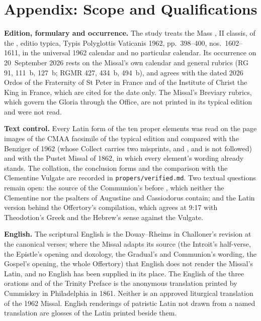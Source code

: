 \section{Appendix: Scope and Qualifications}
\label{sec:scope}

{\small
\textbf{Edition, formulary and occurrence.} The study treats the Mass
, II classis, of the
, editio typica, Typis Polyglottis Vaticanis 1962,
pp.~398--400, nos.~1602--1611, in the universal 1962 calendar and no
particular calendar. Its occurrence on 20~September 2026 rests on the Missal's
own calendar and general rubrics (RG 91, 111~b, 127~b; RGMR 427, 434~b, 494~b),
and agrees with the dated 2026 Ordos of the Fraternity of St Peter in France
and of the Institute of Christ the King in France, which are cited for the date
only. The Missal's Breviary rubrics, which govern the Gloria through the Office,
are not printed in its typical edition and were not read.

\textbf{Text control.} Every Latin form of the ten proper elements was read on
the page images of the CMAA facsimile of the typical edition and compared with
the Benziger  of 1962 (whose Collect carries two
misprints,  and , and is not followed) and with the
Pustet Missal of 1862, in which every element's wording already stands. The
collation, the conclusion forms and the comparison with the Clementine Vulgate
are recorded in \texttt{propers/verified.md}. Two textual questions remain
open: the source of the Communion's  before , which
neither the Clementine nor the psalters of Augustine and Cassiodorus contain;
and the Latin version behind the Offertory's compilation, which agrees at 9:17
with Theodotion's Greek and the Hebrew's sense against the Vulgate.

\textbf{English.} The scriptural English is the Douay--Rheims in Challoner's
revision at the canonical verses; where the Missal adapts its source (the
Introit's half-verse, the Epistle's opening and doxology, the Gradual's and
Communion's wording, the Gospel's opening, the whole Offertory) that English
does not render the Missal's Latin, and no English has been supplied in its
place. The English of the three orations and of the Trinity Preface is the
anonymous translation printed by Cummiskey in Philadelphia in 1861. Neither is
an approved liturgical translation of the 1962 Missal. English renderings of
patristic Latin not drawn from a named translation are glosses of the Latin
printed beside them.

}
